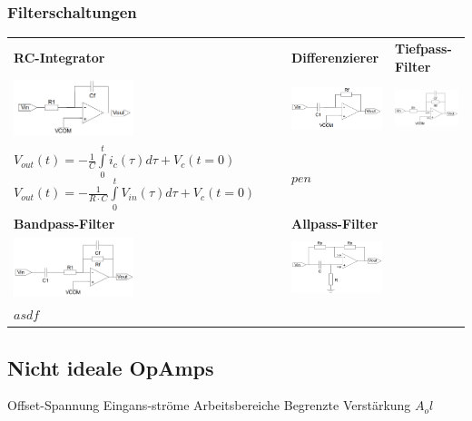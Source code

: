 \documentclass[margin=normal]{tex/hsrzf}
\begin{document}
\subsubsection{Filterschaltungen}
\begingroup
  \small
  \begin{tabularx}{0.8\textwidth}{p{155pt}p{155pt}p{155pt}}  \textbf{RC-Integrator}                    &
    \textbf{Differenzierer}                                                              &
    \textbf{Tiefpass-Filter}                                                               \\
    \includegraphics[width=3.5cm]{img/OpAmp/RC-Integrator.png}                           &
    \includegraphics[width=3.5cm]{img/OpAmp/Differenzierer.png}                          &
    \includegraphics[width=3.5cm]{img/OpAmp/TiefpassFilter.png}                            \\
    $V_{out}(t) = -\frac{1}{C} \int \limits _0 ^t i_c(\tau) d\tau + V_c(t=0)$ \newline
    $V_{out}(t) = -\frac{1}{R \cdot C} \int \limits _0 ^t V_{in}(\tau) d\tau + V_c(t=0)$ &
    $ pen$                                                                               &
    \\
    \textbf{Bandpass-Filter}                                                             &
    \textbf{Allpass-Filter}                                                              &
    \\
    \includegraphics[width=3.5cm]{img/OpAmp/BandPass.png}                                &
    \includegraphics[width=3.5cm]{img/OpAmp/AllPass.png}                                 &
    \\
    $ asdf$
  \end{tabularx}
\endgroup
\subsection{Nicht ideale OpAmps}
Offset-Spannung
Eingans-ströme
Arbeitsbereiche
Begrenzte Verstärkung $A_ol$
\end{document}
